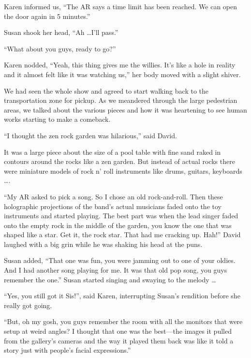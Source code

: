 Karen informed us, ``The AR says a time limit has been reached.
We can open the door again in 5 minutes.''

Susan shook her head, ``Ah \ldots I'll pass.''

``What about you guys, ready to go?''

Karen nodded, ``Yeah, this thing gives me the willies. It's like
a hole in reality and it almost felt like it was watching us,''
her body moved with a slight shiver.

We had seen the whole show and agreed to start walking back to
the transportation zone for pickup. As we meandered through the
large pedestrian areas, we talked about the various pieces and
how it was heartening to see human works starting to make a
comeback.


``I thought the zen rock garden was hilarious,'' said David.

It was a large piece about the size of a pool table with fine
sand raked in contours around the rocks like a zen garden. But
instead of actual rocks there were miniature models of rock n'
roll instruments like drums, guitars, keyboards \ldots.


``My AR asked to pick a song. So I chose an old rock-and-roll.
Then these holographic projections of the band's actual
musicians faded onto the toy instruments and started playing.
The best part was when the lead singer faded onto the empty rock
in the middle of the garden, you know the one that was shaped
like a star. Get it, the rock star. That had me cracking up.
Hah!'' David laughed with a big grin while he was shaking his
head at the puns.

Susan added, ``That one was fun, you were jamming out to one of
your oldies.  And I had another song playing for me.
It was that old pop song, you guys remember the one.''
Susan started singing and swaying to the melody \ldots


``Yes, you still got it Sis{!}'', said Karen, interrupting
Susan's rendition before she really got going.

``But, oh my gosh, you guys remember the room with all the
monitors that were setup at weird angles?  I thought that one
was the best---the images it pulled from the gallery's cameras
and the way it played them back was like it told a story just
with people's facial expressions.''

